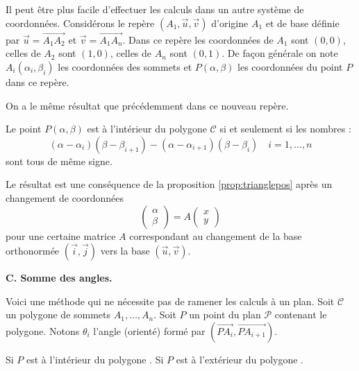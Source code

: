 \documentclass[11pt,class=report,crop=false]{standalone}
\begin{document}
Il peut être plus facile d'effectuer les calculs dans un autre système de coordonnées.
Considérons le repère $(A_1,\vec u,\vec v)$ d'origine $A_1$ et de base définie par 
$\vec u = \overrightarrow{A_1A_2}$ et $\vec v = \overrightarrow{A_1A_n}$.
Dans ce repère les coordonnées de $A_1$ sont $(0,0)$, celles de $A_2$ sont $(1,0)$, celles de $A_n$ sont $(0,1)$. De façon générale on note $A_i(\alpha_i,\beta_i)$ les coordonnées des sommets et $P(\alpha,\beta)$ les coordonnées du point $P$ dans ce repère.



On a le même résultat que précédemment dans ce nouveau repère.
\begin{proposition}
Le point $P(\alpha,\beta)$ est à l'intérieur du polygone $\mathcal{C}$ si et seulement si les nombres :
$$(\alpha-\alpha_i)(\beta-\beta_{i+1}) - (\alpha-\alpha_{i+1})(\beta-\beta_i) \quad i=1,\ldots,n$$
sont tous de même signe.
\end{proposition}

Le résultat est une conséquence de la proposition \ref{prop:trianglepos} après un changement de coordonnées 
$$\begin{pmatrix}\alpha\\\beta\end{pmatrix} = A \begin{pmatrix}x\\y\end{pmatrix}$$
pour une certaine matrice $A$ correspondant au changement de la base orthonormée $(\vec i,\vec j)$ vers la base $(\vec u,\vec v)$.

\medskip
\textbf{C. Somme des angles.}

Voici une méthode qui ne nécessite pas de ramener les calculs à un plan.
Soit $\mathcal{C}$ un polygone de sommets $A_1,\ldots,A_n$.
Soit $P$ un point du plan $\mathcal{P}$ contenant le polygone.
Notons $\theta_i$ l'angle (orienté) formé par $(\overrightarrow{PA_i},\overrightarrow{PA_{i+1}})$.


\begin{proposition}
Si $P$ est à l'intérieur du polygone .
Si $P$ est à l'extérieur du polygone .
\end{proposition}


\begin{center}
	\begin{minipage}{0.35\textwidth}
	\end{minipage}\quad
	\begin{minipage}{0.55\textwidth}
	\end{minipage}
\end{center}
\end{document}
